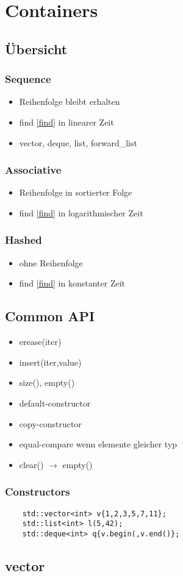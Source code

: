 \section{Containers}
\subsection{Übersicht}
\subsubsection{Sequence}
\begin{itemize}
	\item Reihenfolge bleibt erhalten
	\item find \ref{find} in linearer Zeit
	\item vector, deque, list, forward\_list
\end{itemize}
\subsubsection{Associative}
\begin{itemize}
	\item Reihenfolge in sortierter Folge
	\item find \ref{find} in logarithmischer Zeit
\end{itemize}
\subsubsection{Hashed}
\begin{itemize}
	\item ohne Reihenfolge
	\item find \ref{find} in konstanter Zeit
\end{itemize}
\subsection{Common API}
\begin{itemize}
	\item erease(iter)
	\item insert(iter,value)
	\item size(), empty()
	\item default-constructor
	\item copy-constructor
	\item equal-compare wenn elemente gleicher typ
	\item clear() $\rightarrow$ empty()
\end{itemize}
\subsubsection{Constructors}
\begin{lstlisting}
	std::vector<int> v{1,2,3,5,7,11};
	std::list<int> l(5,42);
	std::deque<int> q{v.begin(,v.end()};
\end{lstlisting}

\subsection{vector}

